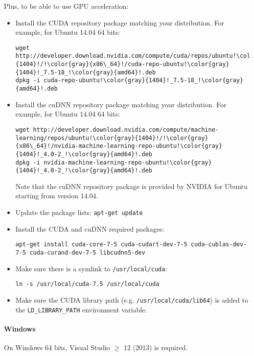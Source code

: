 \documentclass[a4paper,11pt,oneside]{article}
\newenvironment{myitemize}
{ \begin{itemize}
    \setlength{\itemsep}{0pt}
    \setlength{\parskip}{0pt}
    \setlength{\parsep}{0pt}     }
{ \end{itemize}                  }
\begin{document}
Plus, to be able to use GPU acceleration:
\begin{myitemize}
    \item Install the CUDA repository package matching your distribution. For
    example, for Ubuntu 14.04 64 bits:
\begin{lstlisting}[escapechar=!]
wget http://developer.download.nvidia.com/compute/cuda/repos/ubuntu!\color{gray}{1404}!/!\color{gray}{x86\_64}!/cuda-repo-ubuntu!\color{gray}{1404}!_7.5-18_!\color{gray}{amd64}!.deb
dpkg -i cuda-repo-ubuntu!\color{gray}{1404}!_7.5-18_!\color{gray}{amd64}!.deb
\end{lstlisting}
    \item Install the cuDNN repository package matching your distribution. For
    example, for Ubuntu 14.04 64 bits:
\begin{lstlisting}[escapechar=!]
wget http://developer.download.nvidia.com/compute/machine-learning/repos/ubuntu!\color{gray}{1404}!/!\color{gray}{x86\_64}!/nvidia-machine-learning-repo-ubuntu!\color{gray}{1404}!_4.0-2_!\color{gray}{amd64}!.deb
dpkg -i nvidia-machine-learning-repo-ubuntu!\color{gray}{1404}!_4.0-2_!\color{gray}{amd64}!.deb
\end{lstlisting}
    Note that the cuDNN repository package is provided by NVIDIA for Ubuntu starting
    from version 14.04.
    \item Update the package lists: \lstinline!apt-get update!
    \item Install the CUDA and cuDNN required packages:
\begin{lstlisting}[escapechar=!]
apt-get install cuda-core-7-5 cuda-cudart-dev-7-5 cuda-cublas-dev-7-5 cuda-curand-dev-7-5 libcudnn5-dev
\end{lstlisting}
    \item Make sure there is a symlink to \lstinline!/usr/local/cuda!:
\begin{lstlisting}[escapechar=!]
ln -s /usr/local/cuda-7.5 /usr/local/cuda
\end{lstlisting}
    \item Make sure the CUDA library path (e.g. {\tt{}/usr/local/cuda/lib64}) is
     added to the {\tt{}LD\_LIBRARY\_PATH} environment variable.
\end{myitemize}

\paragraph{Windows}

On Windows 64 bits, Visual Studio $\geq$ 12 (2013) is required.
\end{document}
